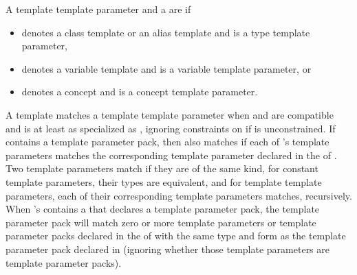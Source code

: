 \pnum
A template template parameter  and
a   are
if
\begin{itemize}
\item
{} denotes a class template or an alias template and
 is a type template parameter,
\item
{} denotes a variable template and
 is a variable template parameter, or
\item
{} denotes a concept and
 is a concept template parameter.
\end{itemize}

\pnum
A template   matches a template
template parameter  when
 and  are compatible and
 is at least as specialized as , ignoring constraints
on  if  is unconstrained.
If  contains a template parameter pack, then  also matches 
if each of 's template parameters
matches the corresponding template parameter declared in the
 of .
Two template parameters match if they are of the same kind,
for constant template parameters, their types are
equivalent, and for template template parameters,
each of their corresponding template parameters matches, recursively.
When 's  contains a 
that declares a template parameter
pack, the template parameter pack will match zero or more template
parameters or template parameter packs declared in the  of
 with the same type and form as the template parameter pack declared in 
(ignoring whether those template parameters are template parameter packs).

